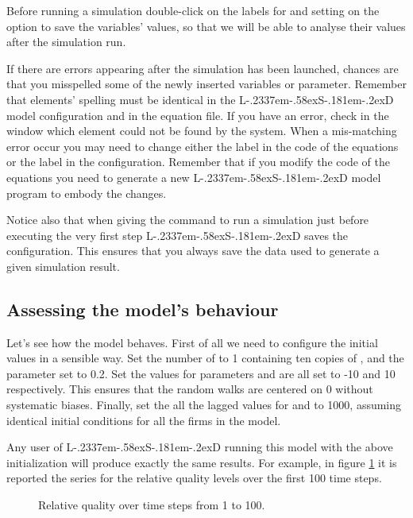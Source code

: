 \documentclass [11pt,a4paper] {book}
\def\LsD{{L\kern-.2337em\lower-.58ex\hbox{S}\kern-.181em\lower-.2ex\hbox{D}}\xspace}
\begin{document}
Before running a simulation double-click on the labels for  and
 setting on the option to save the variables' values, so that we
will be able to analyse their values after the simulation run.

If there are errors appearing after the simulation has been launched, chances are that
you misspelled some of the newly inserted variables or parameter. Remember that elements'
spelling must be identical in the \LsD model configuration and in the equation file. If
you have an error, check in the  window which element could not be found by the
system. When a mis-matching error occur you may need to change either the label in the code of the equations or the label in the configuration. Remember that if you modify the code of the equations you need to generate a new \LsD model program to embody the changes. 

Notice also that when giving the command to run a simulation just before executing the very first step \LsD saves the configuration. This ensures that you always save the data used to generate a given simulation result.


\subsection{Assessing the model's behaviour}
Let's see how the model behaves. First of all we need to configure the initial values in
a sensible way. Set the number of  to 1 containing ten copies of
, and the  parameter set to 0.2. Set the values for parameters
 and  are all set to -10 and 10 respectively. This ensures that
the random walks are centered on 0 without systematic biases. Finally, set the all the
lagged values for  and  to 1000, assuming identical initial conditions for all the firms in the model.

Any user of \LsD running this model with the above initialization will produce exactly the
same results. For example, in figure \ref{fig:relqua} it is reported the series for the
relative quality levels over the first 100 time steps.

\begin{figure}[ht]
  \centering
  \caption{Relative quality over time steps from 1 to 100.}
  \label{fig:relqua}
\end{figure}
\end{document}
